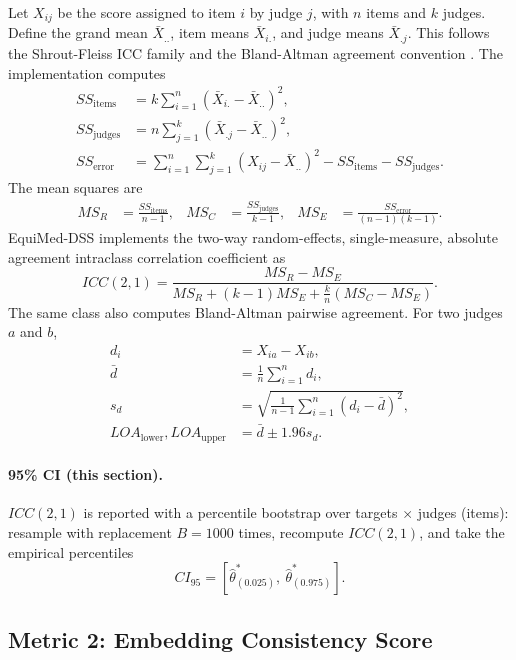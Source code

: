 \documentclass[11pt]{article}
\begin{document}
Let $X_{ij}$ be the score assigned to item $i$ by judge $j$, with $n$ items and
$k$ judges. Define the grand mean $\bar{X}_{..}$, item means $\bar{X}_{i.}$,
and judge means $\bar{X}_{.j}$. This follows the Shrout-Fleiss ICC family and
the Bland-Altman agreement convention \cite{shrout1979,blandaltman1986}. The
implementation computes
\begin{align}
SS_{\mathrm{items}} &= k \sum_{i=1}^{n}(\bar{X}_{i.}-\bar{X}_{..})^2,\\
SS_{\mathrm{judges}} &= n \sum_{j=1}^{k}(\bar{X}_{.j}-\bar{X}_{..})^2,\\
SS_{\mathrm{error}} &= \sum_{i=1}^{n}\sum_{j=1}^{k}(X_{ij}-\bar{X}_{..})^2
 - SS_{\mathrm{items}} - SS_{\mathrm{judges}}.
\end{align}
The mean squares are
\begin{align}
MS_R &= \frac{SS_{\mathrm{items}}}{n-1},&
MS_C &= \frac{SS_{\mathrm{judges}}}{k-1},&
MS_E &= \frac{SS_{\mathrm{error}}}{(n-1)(k-1)}.
\end{align}
EquiMed-DSS implements the two-way random-effects, single-measure, absolute
agreement intraclass correlation coefficient as
\begin{equation}
ICC(2,1)=
\frac{MS_R-MS_E}
{MS_R+(k-1)MS_E+\frac{k}{n}(MS_C-MS_E)}.
\end{equation}
The same class also computes Bland-Altman pairwise agreement. For two judges
$a$ and $b$,
\begin{align}
d_i &= X_{ia}-X_{ib},\\
\bar{d} &= \frac{1}{n}\sum_{i=1}^{n}d_i,\\
s_d &= \sqrt{\frac{1}{n-1}\sum_{i=1}^{n}(d_i-\bar{d})^2},\\
LOA_{\mathrm{lower}}, LOA_{\mathrm{upper}} &= \bar{d}\pm 1.96s_d.
\end{align}


\paragraph{95\% CI (this section).} $ICC(2,1)$ is reported with a percentile bootstrap over targets $\times$ judges (items): resample with replacement $B=1000$ times, recompute $ICC(2,1)$, and take the empirical percentiles
\begin{equation}
CI_{95}=\left[\hat\theta^{\ast}_{(0.025)},\ \hat\theta^{\ast}_{(0.975)}\right].
\end{equation}

\subsection{Metric 2: Embedding Consistency Score}
\end{document}
